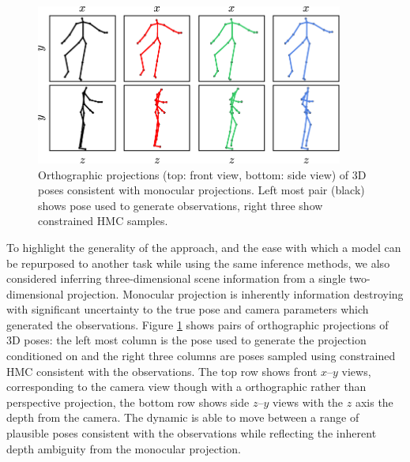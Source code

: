 \begin{figure}[t]
\centering
\includegraphics[width=0.9\textwidth]{images/monocular-pose-sample-projections.pdf}
\caption[Monocular observation pose posterior samples.]{Orthographic projections (top: front view, bottom: side view) of 3D poses consistent with monocular projections. Left most pair (black) shows pose used to generate observations, right three show constrained \ac{HMC} samples.}
\label{fig:pose-monocular-samples}
\end{figure}

To highlight the generality of the approach, and the ease with which a model can be repurposed to another task while using the same inference methods, we also considered inferring three-dimensional scene information from a single two-dimensional projection. Monocular projection is inherently information destroying with significant uncertainty to the true pose and camera parameters which generated the observations. Figure \ref{fig:pose-monocular-samples} shows pairs of orthographic projections of 3D poses: the left most column is the pose used to generate the projection conditioned on and the right three columns are poses sampled using constrained \ac{HMC} consistent with the observations. The top row shows front $x$--$y$ views, corresponding to the camera view though with a orthographic rather than perspective projection, the bottom row shows side $z$--$y$ views with the $z$ axis the depth from the camera. The dynamic is able to move between a range of plausible poses consistent with the observations while reflecting the inherent depth ambiguity from the monocular projection.

